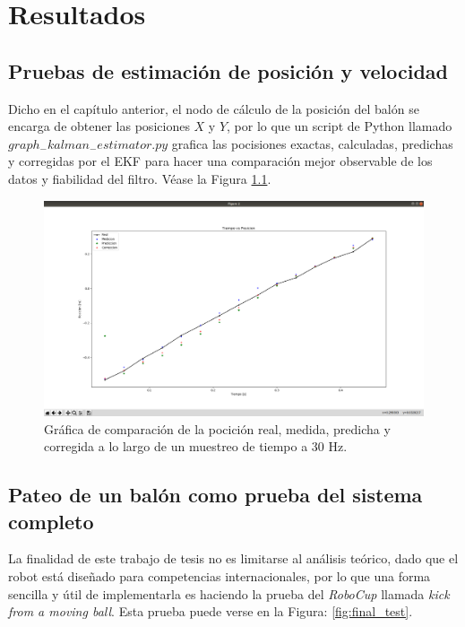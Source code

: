\chapter{Resultados}
\section{Pruebas de estimación de posición y velocidad}
	Dicho en el capítulo anterior, el nodo de cálculo de la posición del balón se encarga de obtener las posiciones $X$ y $Y$, por lo que un script de Python llamado $graph_-kalman_-estimator.py$ grafica las pocisiones exactas, calculadas, predichas y corregidas por el EKF para hacer una comparación mejor observable de los datos y fiabilidad del filtro. Véase la Figura \ref{fig:estimator_graphics}.
	
\begin{figure}
\centering
	\includegraphics[scale=0.15]{images/data_1.png}
	\caption{Gráfica de comparación de la pocición real, medida, predicha y corregida a lo largo de un muestreo de tiempo a 30 Hz.}
\label{fig:estimator_graphics}
\end{figure}

\section{Pateo de un balón como prueba del sistema completo}

	La finalidad de este trabajo de tesis no es limitarse al análisis teórico, dado que el robot está diseñado para competencias internacionales, por lo que una forma sencilla y útil de implementarla es haciendo la prueba del \textit{RoboCup} llamada \textit{kick from a moving ball}. Esta prueba puede verse en la Figura: \ref{fig:final_test}.
	
